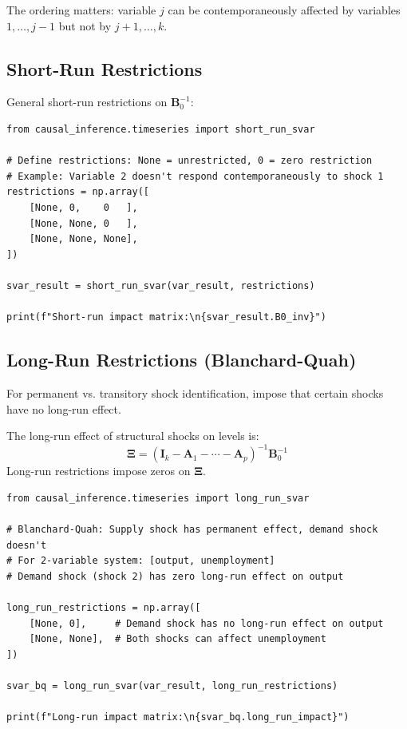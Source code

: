 The ordering matters: variable $j$ can be contemporaneously affected by variables $1, \ldots, j-1$ but not by $j+1, \ldots, k$.

\subsection{Short-Run Restrictions}

General short-run restrictions on $\mathbf{B}_0^{-1}$:

\begin{verbatim}
from causal_inference.timeseries import short_run_svar

# Define restrictions: None = unrestricted, 0 = zero restriction
# Example: Variable 2 doesn't respond contemporaneously to shock 1
restrictions = np.array([
    [None, 0,    0   ],
    [None, None, 0   ],
    [None, None, None],
])

svar_result = short_run_svar(var_result, restrictions)

print(f"Short-run impact matrix:\n{svar_result.B0_inv}")
\end{verbatim}

\subsection{Long-Run Restrictions (Blanchard-Quah)}

For permanent vs. transitory shock identification, impose that certain shocks have no long-run effect.

\begin{theorem}
The long-run effect of structural shocks on levels is:
\begin{equation}
\boldsymbol{\Xi} = (\mathbf{I}_k - \mathbf{A}_1 - \cdots - \mathbf{A}_p)^{-1} \mathbf{B}_0^{-1}
\end{equation}
Long-run restrictions impose zeros on $\boldsymbol{\Xi}$.
\end{theorem}

\begin{verbatim}
from causal_inference.timeseries import long_run_svar

# Blanchard-Quah: Supply shock has permanent effect, demand shock doesn't
# For 2-variable system: [output, unemployment]
# Demand shock (shock 2) has zero long-run effect on output

long_run_restrictions = np.array([
    [None, 0],     # Demand shock has no long-run effect on output
    [None, None],  # Both shocks can affect unemployment
])

svar_bq = long_run_svar(var_result, long_run_restrictions)

print(f"Long-run impact matrix:\n{svar_bq.long_run_impact}")
\end{verbatim}


